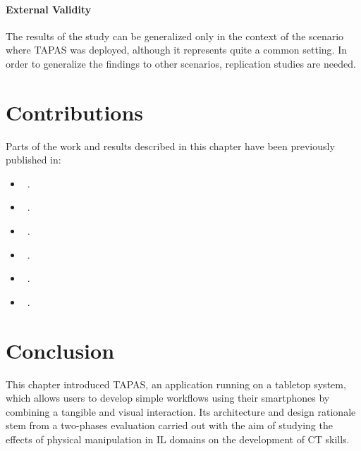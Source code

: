 \paragraph{External Validity} The results of the study can be generalized only in the context of the scenario where \ac{TAPAS} was deployed, although it represents quite a common setting. In order to generalize the findings to other scenarios, replication studies are needed.

\section{Contributions}
Parts of the work and results described in this chapter have been previously published in:
\begin{itemize}
  \item {}~\cite{Turchi:2015dr}.
  \item {}~\cite{Turchi:2015kr}.
  \item {}~\cite{turchi2017tapas}.
  \item {}~\cite{malizia2017block}.
  \item {}~\cite{desolda2018tangible}.
  \item {}~\cite{dix2016rich}.
\end{itemize}

\section{Conclusion}
This chapter introduced \acs{TAPAS}, an application running on a tabletop system, which allows users to develop simple workflows using their smartphones by combining a tangible and visual interaction. Its architecture and design rationale stem from a two-phases evaluation carried out with the aim of studying the effects of physical manipulation in \ac{IL} domains on the development of \ac{CT} skills.

